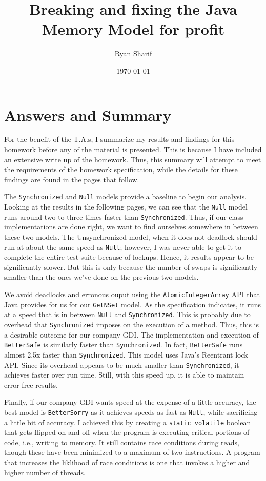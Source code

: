 \documentclass[11pt]{article}
\author{Ryan Sharif}
\date{\today}
\title{Breaking and fixing the Java Memory Model for profit}
\begin{document}
\maketitle
\tableofcontents


\section{Answers and Summary}
\label{sec-1}
For the benefit of the T.A.s, I summarize my results and
findings for this homework before any of the material is
presented. This is because I have included an extensive
write up of the homework. Thus, this summary will attempt
to meet the requirements of the homework specification,
while the details for these findings are found in the
pages that follow.

The \verb~Synchronized~ and \verb~Null~ models provide a baseline
to begin our analysis. Looking at the results in the
following pages, we can see that the \verb~Null~ model runs
around two to three times faster than \verb~Synchronized~.
Thus, if our class implementations are done right, we
want to find ourselves somewhere in between these two
models. The Unsynchronized model, when it does not deadlock
should run at about the same speed as \verb~Null~; however,
I was never able to get it to complete the entire test
suite because of lockups. Hence, it results appear to
be significantly slower. But this is only because the
number of swaps is significantly smaller than the ones
we've done on the previous two models.

We avoid deadlocks and erronous ouput using the \verb~AtomicIntegerArray~
API that Java provides for us for our \verb~GetNSet~ model.  As the
specification indicates, it runs at a speed that is in between \verb~Null~
and \verb~Synchronized~. This is probably due to overhead that
\verb~Synchronized~ imposes on the execution of a method. Thus, this is a
desirable outcome for our company GDI. The implementation and
execution of \verb~BetterSafe~ is similarly faster than \verb~Synchronized~.
In fact, \verb~BetterSafe~ runs almost 2.5x faster than \verb~Synchronized~.
This model uses Java's Reentrant lock API. Since its overhead appears
to be much smaller than \verb~Synchronized~, it achieves faster over
run time. Still, with this speed up, it is able to maintain 
error-free results.

Finally, if our company GDI wants speed at the expense of a little
accuracy, the best model is \verb~BetterSorry~ as it achieves speeds
as fast as \verb~Null~, while sacrificing a little bit of accuracy.
I achieved this by creating a \verb~static volatile~ boolean that gets
flipped on and off when the program is executing critical portions
of code, i.e., writing to memory. It still contains race conditions
during reads, though these have been minimized to a maximum of two
instructions. A program that increases the liklihood of race conditions
is one that invokes a higher and higher number of threads.
\end{document}
